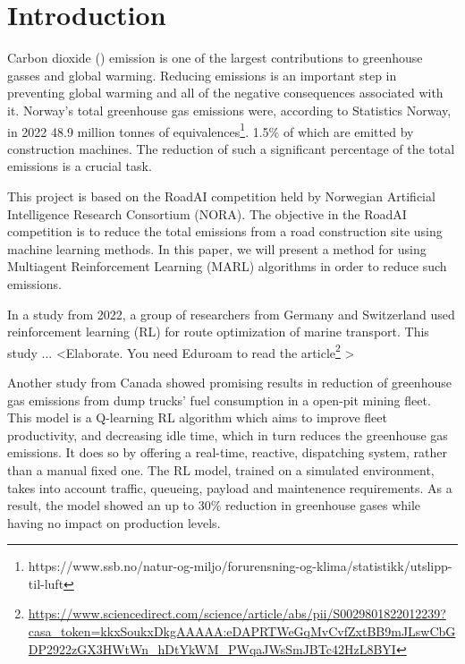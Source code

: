 \documentclass[conference]{IEEEtran}
\begin{document}
  \section{Introduction}
  Carbon dioxide (\coo{}) emission is one of the largest contributions to greenhouse gasses and global warming.
  Reducing \coo{} emissions is an important step in preventing global warming and all of the negative
  consequences associated with it. Norway's total greenhouse gas emissions were, according to Statistics
  Norway, in 2022 48.9 million tonnes of \coo{}
  equivalences\footnote{https://www.ssb.no/natur-og-miljo/forurensning-og-klima/statistikk/utslipp-til-luft}.
  1.5\% of which are emitted by construction machines. \cite{noraRoadAIReducing} The reduction of such
  a significant percentage of the total emissions is a crucial task.

  This project is based on the RoadAI competition held by Norwegian Artificial Intelligence Research
  Consortium (NORA). \cite{noraRoadAIReducing} The objective in the RoadAI competition is to reduce the
  total \coo{} emissions from a road construction site using machine learning methods. In this paper, we will
  present a method for using Multiagent Reinforcement Learning (MARL) algorithms in order to reduce such
  emissions.

  In a study from 2022, a group of researchers from Germany and Switzerland used reinforcement learning
  (RL) for route optimization of marine transport. \cite{MORADI2022111882} This study ... \textless Elaborate. You need
  Eduroam to read the article\footnote{\url{https://www.sciencedirect.com/science/article/abs/pii/S0029801822012239?casa_token=kkxSoukxDkgAAAAA:eDAPRTWeGqMvCvfZxtBB9mJLswCbGDP2922zGX3HWtWn_hDtYkWM_PWqaJWsSmJBTc42HzL8BYI}} \textgreater

  Another study from Canada \cite{HUO2023106664} showed promising results in reduction of greenhouse gas
  emissions
  from dump trucks' fuel consumption in a open-pit mining fleet. This model is a Q-learning RL algorithm
  which aims to improve fleet productivity, and decreasing idle time, which in turn reduces the greenhouse
  gas emissions. It does so by offering a real-time, reactive,  dispatching system, rather than a manual
  fixed one. The RL model, trained on a simulated environment, takes into account traffic, queueing,
  payload and maintenence requirements. As a result, the model showed an up to 30\% reduction in greenhouse
  gases while having no impact on production levels.
\end{document}

